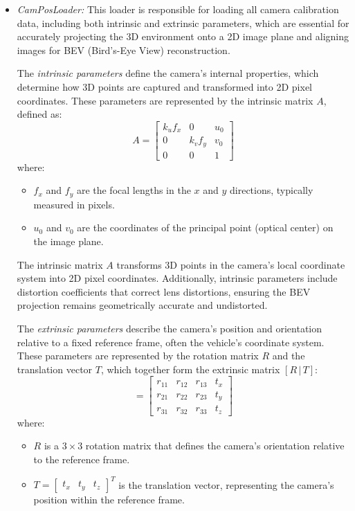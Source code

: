 \begin{itemize}
\item \textit{CamPosLoader:} This loader is responsible for loading all camera calibration data, including both intrinsic and extrinsic parameters, which are essential for accurately projecting the 3D environment onto a 2D image plane and aligning images for BEV (Bird's-Eye View) reconstruction.

    The \textit{intrinsic parameters} define the camera’s internal properties, which determine how 3D points are captured and transformed into 2D pixel coordinates. These parameters are represented by the intrinsic matrix \( A \), defined as:
    \begin{equation}
        A = \begin{bmatrix}
        k_uf_x & 0 & u_0 \\ 
        0 & k_vf_y & v_0 \\ 
        0 & 0 & 1 
        \end{bmatrix}
    \end{equation}
    where:
    \begin{itemize}
        \item \( f_x \) and \( f_y \) are the focal lengths in the \( x \) and \( y \) directions, typically measured in pixels.
        \item \( u_0 \) and \( v_0 \) are the coordinates of the principal point (optical center) on the image plane.
    \end{itemize}
    The intrinsic matrix \( A \) transforms 3D points in the camera’s local coordinate system into 2D pixel coordinates. Additionally, intrinsic parameters include distortion coefficients that correct lens distortions, ensuring the BEV projection remains geometrically accurate and undistorted.

    The \textit{extrinsic parameters} describe the camera's position and orientation relative to a fixed reference frame, often the vehicle's coordinate system. These parameters are represented by the rotation matrix \( R \) and the translation vector \( T \), which together form the extrinsic matrix \( [R \,|\, T] \):
    \begin{equation}
        [R \,|\, T] = \begin{bmatrix}
        r_{11} & r_{12} & r_{13} & t_x \\ 
        r_{21} & r_{22} & r_{23} & t_y \\ 
        r_{31} & r_{32} & r_{33} & t_z 
        \end{bmatrix}
    \end{equation}
    where:
    \begin{itemize}
        \item \( R \) is a \( 3 \times 3 \) rotation matrix that defines the camera’s orientation relative to the reference frame.
        \item \( T = \begin{bmatrix} t_x & t_y & t_z \end{bmatrix}^T \) is the translation vector, representing the camera’s position within the reference frame.
    \end{itemize}


\end{itemize}
